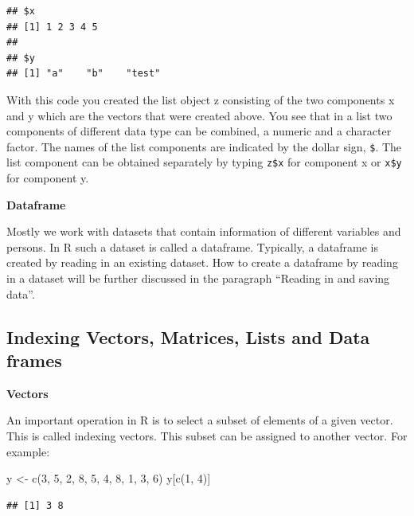 \documentclass[
]{book}
\newenvironment{Shaded}{\begin{snugshade}}{\end{snugshade}}
\newcommand{\DecValTok}[1]{\textcolor[rgb]{0.00,0.00,0.81}{#1}}
\newcommand{\FunctionTok}[1]{\textcolor[rgb]{0.00,0.00,0.00}{#1}}
\newcommand{\NormalTok}[1]{#1}
\newcommand{\OtherTok}[1]{\textcolor[rgb]{0.56,0.35,0.01}{#1}}
\begin{document}
\begin{verbatim}
## $x
## [1] 1 2 3 4 5
## 
## $y
## [1] "a"    "b"    "test"
\end{verbatim}

With this code you created the list object z consisting of the two components x and y which are the vectors that were created above. You see that in a list two components of different data type can be combined, a numeric and a character factor. The names of the list components are indicated by the dollar sign, \texttt{\$}. The list component can be obtained separately by typing \texttt{z\$x} for component x or \texttt{x\$y} for component y.

\textbf{Dataframe}

Mostly we work with datasets that contain information of different variables and persons. In R such a dataset is called a dataframe. Typically, a dataframe is created by reading in an existing dataset. How to create a dataframe by reading in a dataset will be further discussed in the paragraph ``Reading in and saving data''.

\hypertarget{indexing-vectors-matrices-lists-and-data-frames}{%
\subsection{Indexing Vectors, Matrices, Lists and Data frames}\label{indexing-vectors-matrices-lists-and-data-frames}}

\textbf{Vectors}

An important operation in R is to select a subset of elements of a given vector. This is called indexing vectors. This subset can be assigned to another vector. For example:

\begin{Shaded}
\begin{Highlighting}[]
\NormalTok{y }\OtherTok{\textless{}{-}} \FunctionTok{c}\NormalTok{(}\DecValTok{3}\NormalTok{, }\DecValTok{5}\NormalTok{, }\DecValTok{2}\NormalTok{, }\DecValTok{8}\NormalTok{, }\DecValTok{5}\NormalTok{, }\DecValTok{4}\NormalTok{, }\DecValTok{8}\NormalTok{, }\DecValTok{1}\NormalTok{, }\DecValTok{3}\NormalTok{, }\DecValTok{6}\NormalTok{)}
\NormalTok{y[}\FunctionTok{c}\NormalTok{(}\DecValTok{1}\NormalTok{, }\DecValTok{4}\NormalTok{)]}
\end{Highlighting}
\end{Shaded}

\begin{verbatim}
## [1] 3 8
\end{verbatim}
\end{document}
